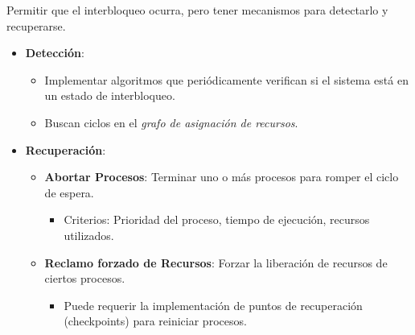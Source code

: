 Permitir que el interbloqueo ocurra, pero tener mecanismos para detectarlo y recuperarse.

\begin{itemize}
	\item \textbf{Detección}:
	\begin{itemize}
		\item Implementar algoritmos que periódicamente verifican si el sistema está en un estado de interbloqueo.
		\item Buscan ciclos en el \textit{grafo de asignación de recursos}.
	\end{itemize}
	\item \textbf{Recuperación}:
	\begin{itemize}
		\item \textbf{Abortar Procesos}: Terminar uno o más procesos para romper el ciclo de espera.
		\begin{itemize}
			\item Criterios: Prioridad del proceso, tiempo de ejecución, recursos utilizados.
		\end{itemize}
		\item \textbf{Reclamo forzado	 de Recursos}: Forzar la liberación de recursos de ciertos procesos.
		\begin{itemize}
			\item Puede requerir la implementación de puntos de recuperación (checkpoints) para reiniciar procesos.
		\end{itemize}
	\end{itemize}
\end{itemize}




